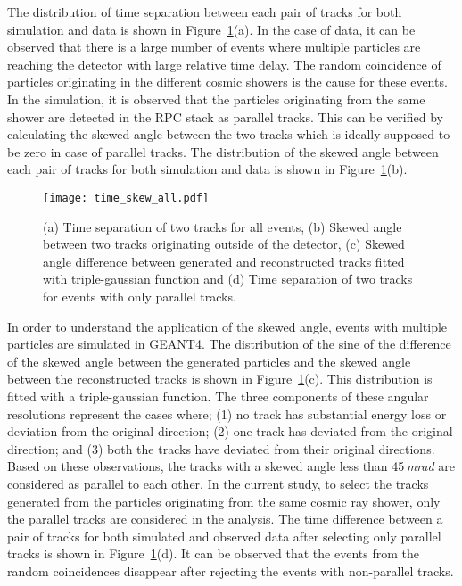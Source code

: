 The distribution of time separation between each pair of tracks for both simulation and data is shown in Figure~\ref{fig:time_sep}(a). In the case of data, it can be observed that there is a large number of events where multiple particles are reaching the detector with large relative time delay. The random coincidence of particles originating in the different cosmic showers is the cause for these events. In the simulation, it is observed that the particles originating from the same shower are detected in the RPC stack as parallel tracks. This can be verified by calculating the skewed angle between the two tracks which is ideally supposed to be zero in case of parallel tracks. The distribution of the skewed angle between each pair of tracks for both simulation and data is shown in Figure~\ref{fig:time_sep}(b).
\begin{figure}[h]
  \texttt{[image: time\_skew\_all.pdf]} 
  \caption{(a) Time separation of two tracks for all events, (b) Skewed angle between two tracks originating outside of the detector, (c) Skewed angle difference between generated and reconstructed tracks fitted with triple-gaussian function and (d) Time separation of two tracks for events with only parallel tracks.}
  \label{fig:time_sep}
\end{figure}

In order to understand the application of the skewed angle, events with multiple particles are simulated in GEANT4. The distribution of the sine of the difference of the skewed angle between the generated particles and the skewed angle between the reconstructed tracks is shown in Figure~\ref{fig:time_sep}(c). This distribution is fitted with a triple-gaussian function. The three components of these angular resolutions represent the cases where; (1) no track has substantial energy loss or deviation from the original direction; (2) one track has deviated from the original direction; and (3) both the tracks have deviated from their original directions. Based on these observations, the tracks with a skewed angle less than 45\,\textit{mrad} are considered as parallel to each other. In the current study, to select the tracks generated from the particles originating from the same cosmic ray shower, only the parallel tracks are considered in the analysis. The time difference between a pair of tracks for both simulated and observed data after selecting only parallel tracks is shown in Figure~\ref{fig:time_sep}(d). It can be observed that the events from the random coincidences disappear after rejecting the events with non-parallel tracks.

